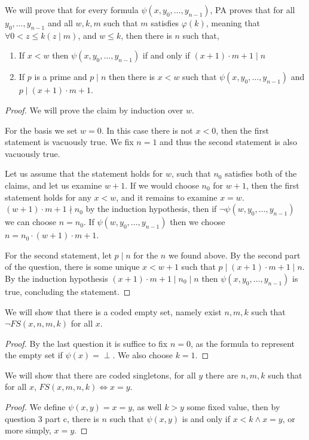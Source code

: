 \subquestion{}
We will prove that for every formula $\psi(x, y_0, \ldots, y_{n - 1})$, PA proves that for all $y_0, \ldots, y_{n - 1}$ and all $w, k, m$ such that $m$ satisfies $\varphi(k)$,
meaning that $\forall 0 < z \le k (z \mid m)$, and $w \le k$, then there is $n$ such that,
\begin{enumerate}
	\item If $x < w$ then $\psi(x, y_0, \ldots, y_{n - 1})$ if and only if $(x + 1) \cdot m + 1 \mid n$
	\item If $p$ is a prime and $p \mid n$ then there is $x < w$ such that $\psi(x, y_0, \ldots, y_{n - 1})$ and $p \mid (x + 1) \cdot m + 1$.
\end{enumerate}
\begin{proof}
	We will prove the claim by induction over $w$.

	For the basis we set $w = 0$.
	In this case there is not $x < 0$, then the first statement is vacuously true.
	We fix $n = 1$ and thus the second statement is also vacuously true.

	Let us assume that the statement holds for $w$, such that $n_0$ satisfies both of the claims, and let us examine $w + 1$.
	If we would choose $n_0$ for $w + 1$, then the first statement holds for any $x < w$, and it remains to examine $x = w$.
	$(w + 1) \cdot m + 1 \nmid n_0$ by the induction hypothesis, then if $\lnot \psi(w, y_0, \ldots, y_{n - 1})$ we can choose $n = n_0$.
	If $\psi(w, y_0, \ldots, y_{n - 1})$ then we choose $n = n_0 \cdot (w + 1) \cdot m + 1$.

	For the second statement, let $p \mid n$ for the $n$ we found above.
	By the second part of the question, there is some unique $x < w + 1$ such that $p \mid (x + 1) \cdot m + 1 \mid n$.
	By the induction hypothesis $(x + 1) \cdot m + 1 \mid n_0 \mid n$ then $\psi(x, y_0, \ldots, y_{n - 1})$ is true, concluding the statement.
\end{proof}

\question{}
\subquestion{}
We will show that there is a coded empty set, namely exist $n, m, k$ such that $\lnot FS(x, n, m, k)$ for all $x$.
\begin{proof}
	By the last question it is suffice to fix $n = 0$, as the formula to represent the empty set if $\psi(x) = \perp$.
	We also choose $k = 1$.
\end{proof}

\subquestion{}
We will show that there are coded singletons, for all $y$ there are $n, m, k$ such that for all $x$, $FS(x, m, n, k) \iff x = y$.
\begin{proof}
	We define $\psi(x, y) = x = y$, as well $k > y$ some fixed value, then by question 3 part c, there is $n$ such that $\psi(x, y)$ is and only if $x < k \land x = y $, or more simply, $x = y$.
\end{proof}

